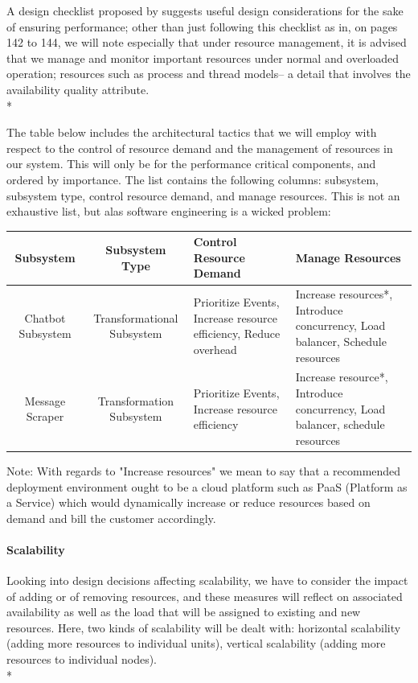 \documentclass[11pt]{article}
\begin{document}
A design checklist proposed by \cite{Book:2} suggests useful design considerations for the sake of ensuring performance; other than just following this checklist as in, on pages 142 to 144, we will note especially that under resource management, it is advised that we manage and monitor important resources under normal and overloaded operation; resources such as process and thread models-- a detail that involves the availability quality attribute. \\*

The table below includes the architectural tactics that we will employ with respect to the control of resource demand and the management of resources in our system. This will only be for the performance critical components, and ordered by importance. The list contains the following columns: subsystem, subsystem type, control resource demand, and manage resources. This is not an exhaustive list, but alas software engineering is a wicked problem:
\begin{center}
	\hspace*{-1.5cm}\begin{tabular}{|c|c|p{5cm}|p{6cm}|}
		\hline
		Subsystem & Subsystem Type & Control Resource Demand & Manage Resources \\
		\hline
		Chatbot Subsystem & Transformational Subsystem & Prioritize Events, Increase resource efficiency, Reduce overhead & Increase resources*, Introduce concurrency, Load balancer, Schedule resources \\
		\hline
		Message Scraper & Transformation Subsystem & Prioritize Events, Increase resource efficiency & Increase resource*, Introduce concurrency, Load balancer, schedule resources \\
		\hline
	\end{tabular}
\end{center}
Note: With regards to "Increase resources" we mean to say that a recommended deployment environment ought to be a cloud platform such as PaaS (Platform as a Service) which would dynamically increase or reduce resources based on demand and bill the customer accordingly.

\paragraph{Scalability}
Looking into design decisions affecting scalability, we have to consider the impact of adding or of removing resources, and these measures will reflect on associated availability as well as the load that will be assigned to existing and new resources\cite{Book:2}. Here, two kinds of scalability will be dealt with: horizontal scalability (adding more resources to individual units), vertical scalability (adding more resources to individual nodes).\\*
\end{document}
